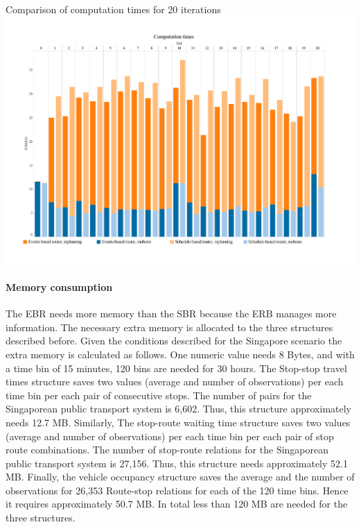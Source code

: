 \createfigure
{}
{Comparison of computation times for 20 iterations}
{\label{fig:CompTimes}}
{\includegraphics[width=1.0\textwidth]{extending/figures/ebr/ComputationTimes.pdf}}
{}

\paragraph{Memory consumption}

The EBR needs more memory than the SBR because the ERB manages more information. The necessary extra memory is allocated to the three structures described before. Given the conditions described for the Singapore scenario the extra memory is calculated as follows. One numeric value needs 8 Bytes, and with a time bin of 15 minutes, 120 bins are needed for 30 hours. The Stop-stop travel times structure saves two values (average and number of observations) per each time bin per each pair of consecutive stops. The number of pairs for the Singaporean public transport system is 6,602. Thus, this structure approximately needs 12.7 MB. Similarly, The stop-route waiting time structure saves two values (average and number of observations) per each time bin per each pair of stop route combinations. The number of stop-route relations for the Singaporean public transport system is 27,156. Thus, this structure needs approximately 52.1 MB. Finally, the vehicle occupancy structure saves the average and the number of observations for 26,353 Route-stop relations for each of the 120 time bins. Hence it requires approximately 50.7 MB. In total less than 120 MB are needed for the three structures.

